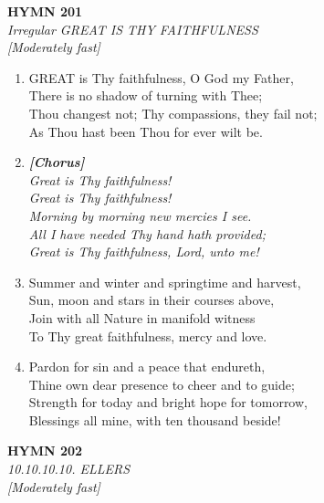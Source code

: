 \newpage
\begin{center}
    {\Large \textbf{HYMN 201}}
    \\
    \textit{Irregular GREAT IS THY FAITHFULNESS}
    \\
    \textit{\small [Moderately fast]}
\end{center}
\vspace{1em}

\begin{enumerate}
    \item GREAT is Thy faithfulness, O God my Father, \\
        There is no shadow of turning with Thee; \\
        Thou changest not; Thy compassions, they fail not; \\
        As Thou hast been Thou for ever wilt be.

    \item[] \vspace{0.4em}
    \textbf{\textit{[Chorus]}} \\
    \textit{Great is Thy faithfulness!} \\
    \textit{Great is Thy faithfulness!} \\
    \textit{Morning by morning new mercies I see.} \\
    \textit{All I have needed Thy hand hath provided;} \\
    \textit{Great is Thy faithfulness, Lord, unto me!}
    \vspace{0.4em}

    \item Summer and winter and springtime and harvest, \\
        Sun, moon and stars in their courses above, \\
        Join with all Nature in manifold witness \\
        To Thy great faithfulness, mercy and love.

    \item Pardon for sin and a peace that endureth, \\
        Thine own dear presence to cheer and to guide; \\
        Strength for today and bright hope for tomorrow, \\
        Blessings all mine, with ten thousand beside!

\end{enumerate}

\newpage
\begin{center}
    {\Large \textbf{HYMN 202}}
    \\
    \textit{10.10.10.10. ELLERS}
    \\
    \textit{\small [Moderately fast]}
\end{center}
\vspace{1em}

